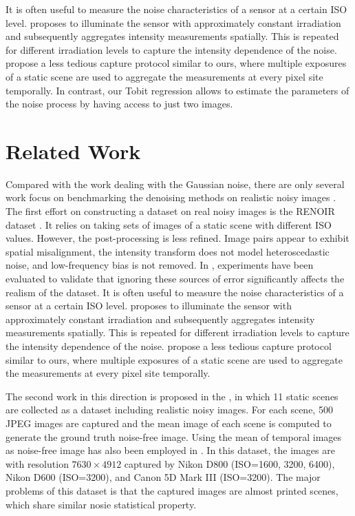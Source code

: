 It is often useful to measure the noise characteristics of a sensor at a certain ISO level. \cite{} proposes to illuminate the sensor with approximately constant irradiation and subsequently aggregates intensity measurements spatially. This is repeated for different irradiation levels to capture the intensity dependence of the noise. \cite{} propose a less tedious capture protocol similar to ours, where multiple exposures of a static scene are used to aggregate the measurements at every pixel site temporally. In contrast, our Tobit regression allows to estimate the parameters of the noise process by having access to just two images.


\section{Related Work}

Compared with the work dealing with the Gaussian noise, there are only several work focus on benchmarking the denoising methods on realistic noisy images \cite{RENOIR2014,crosschannel2016,dnd2017}. The first effort on constructing a dataset on real noisy images is the RENOIR dataset \cite{RENOIR2014}. It relies on taking sets of images of a static scene with different ISO values. However, the post-processing is less refined. Image pairs appear to exhibit spatial misalignment, the intensity transform does not model heteroscedastic noise, and low-frequency bias is not removed. In \cite{RENOIR2014}, experiments have been evaluated to validate that ignoring these sources of error significantly
affects the realism of the dataset. It is often useful to measure the noise characteristics of a sensor at a certain ISO level. \cite{RENOIR2014} proposes to illuminate the sensor with approximately constant irradiation and subsequently aggregates intensity measurements spatially. This is repeated for different irradiation levels to capture the intensity dependence of the noise. \cite{RENOIR2014} propose a less tedious capture protocol similar to ours, where multiple exposures of a static scene are used to aggregate the measurements at every pixel site temporally.

The second work in this direction is proposed in the \cite{crosschannel2016}, in which 11 static scenes are collected as a dataset including realistic noisy images. For each scene, 500 JPEG images are captured and the mean image of each scene is computed to generate the ground truth noise-free image. Using the mean of temporal images as noise-free image has also been employed in \cite{Liu2008,liupractical}. In this dataset, the images are with resolution $7630\times4912$ captured by Nikon D800 (ISO=1600, 3200, 6400), Nikon D600 (ISO=3200), and Canon 5D Mark III (ISO=3200). The major problems of this dataset is that the captured images are almost printed scenes, which share similar nosie statistical property. 

